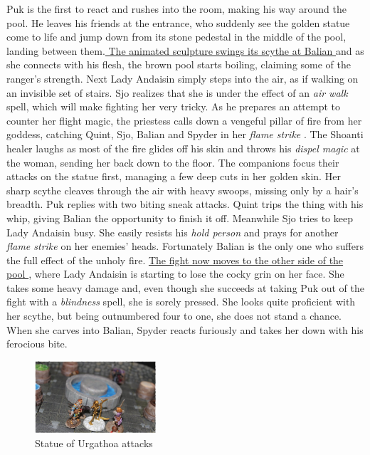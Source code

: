Puk is the first to react and rushes into the room, making his way around the pool. He leaves his friends at the entrance, who suddenly see the golden statue come to life and jump down from its stone pedestal in the middle of the pool, landing between them.\hyperref[fig:Statue-of-Urgathoa-attacks-523052019]{ The animated sculpture swings its scythe at Balian } and as she connects with his flesh, the brown pool starts boiling, claiming some of the ranger's strength. Next Lady Andaisin simply steps into the air, as if walking on an invisible set of stairs. Sjo realizes that she is under the effect of an  {\itshape air walk} spell, which will make fighting her very tricky. As he prepares an attempt to counter her flight magic, the priestess calls down a vengeful pillar of fire from her goddess, catching Quint, Sjo, Balian and Spyder in her  {\itshape flame strike} . The Shoanti healer laughs as most of the fire glides off his skin and throws his  {\itshape dispel magic} at the woman, sending her back down to the floor. The companions focus their attacks on the statue first, managing a few deep cuts in her golden skin. Her sharp scythe cleaves through the air with heavy swoops, missing only by a hair's breadth. Puk replies with two biting sneak attacks. Quint trips the thing with his whip, giving Balian the opportunity to finish it off. Meanwhile Sjo tries to keep Lady Andaisin busy. She easily resists his  {\itshape hold person} and prays for another  {\itshape flame strike} on her enemies' heads. Fortunately Balian is the only one who suffers the full effect of the unholy fire. \hyperref[fig:Facing-Lady-Andaisin-523052184]{ The fight now moves to the other side of the pool } , where Lady Andaisin is starting to lose the cocky grin on her face. She takes some heavy damage and, even though she succeeds at taking Puk out of the fight with a  {\itshape blindness} spell, she is sorely pressed. She looks quite proficient with her scythe, but being outnumbered four to one, she does not stand a chance. When she carves into Balian, Spyder reacts furiously and takes her down with his ferocious bite. \\

\begin{figure}[h]
	\centering
	\includegraphics[width=0.4\textwidth]{images/Statue-of-Urgathoa-attacks-523052019_mod.jpg}
	\caption{Statue of Urgathoa attacks}
	\label{fig:Statue-of-Urgathoa-attacks-523052019}
\end{figure}

